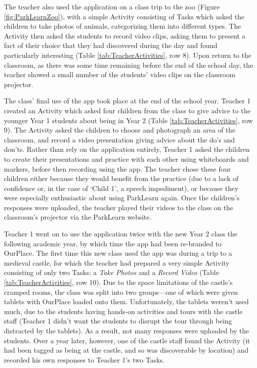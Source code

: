 The teacher also used the application on a class trip to the zoo (Figure \ref{fig:ParkLearnZoo}), with a simple Activity consisting of Tasks which asked the children to take photos of animals, categorizing them into different types. The Activity then asked the students to record video clips, asking them to present a fact of their choice that they had discovered during the day and found particularly interesting (Table \ref{tab:TeacherActivities}, row 8). Upon return to the classroom, as there was some time remaining before the end of the school day, the teacher showed a small number of the students' video clips on the classroom projector.

The class' final use of the app took place at the end of the school year. Teacher 1 created an Activity which asked four children from the class to give advice to the younger Year 1 students about being in Year 2 (Table \ref{tab:TeacherActivities}, row 9). The Activity asked the children to choose and photograph an area of the classroom, and record a video presentation giving advice about the do’s and don’ts. Rather than rely on the application entirely, Teacher 1 asked the children to create their presentations and practice with each other using whiteboards and markers, before then recording using the app. The teacher chose these four children either because they would benefit from the practice (due to a lack of confidence or, in the case of ‘Child 1’, a speech impediment), or because they were especially enthusiastic about using ParkLearn again. Once the children's responses were uploaded, the teacher played their videos to the class on the classroom's projector via the ParkLearn website.

Teacher 1 went on to use the application twice with the new Year 2 class the following academic year, by which time the app had been re-branded to OurPlace. The first time this new class used the app was during a trip to a medieval castle, for which the teacher had prepared a very simple Activity consisting of only two Tasks: a \textit{Take Photos} and a \textit{Record Video} (Table \ref{tab:TeacherActivities}, row 10). Due to the space limitations of the castle's cramped rooms, the class was split into two groups---one of which were given tablets with OurPlace loaded onto them. Unfortunately, the tablets weren't used much, due to the students having hands-on activities and tours with the castle staff (Teacher 1 didn't want the students to disrupt the tour through being distracted by the tablets). As a result, not many responses were uploaded by the students. Over a year later, however, one of the castle staff found the Activity (it had been tagged as being at the castle, and so was discoverable by location) and recorded his own responses to Teacher 1's two Tasks.

